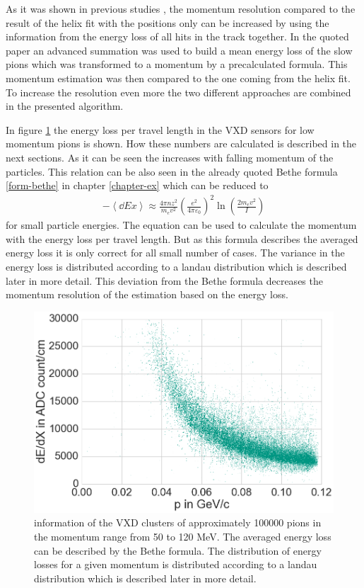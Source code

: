 As it was shown in previous studies \cite{robert}, the momentum resolution compared to the result of the helix fit with the positions only can be increased by using the information from the energy loss of all hits in the track together. In the quoted paper an advanced summation was used to build a mean energy loss of the slow pions which was transformed to a momentum by a precalculated formula. This momentum estimation was then compared to the one coming from the helix fit. To increase the resolution even more the two different approaches are combined in the presented algorithm.

In figure \ref{fig-dedx-over-p} the energy loss per travel length in the VXD sensors for low momentum pions is shown. How these numbers are calculated is described in the next sections. As it can be seen the \dedx increases with falling momentum of the particles. This relation can be also seen in the already quoted Bethe formula \ref{form-bethe} in chapter \ref{chapter-ex} which can be reduced to 
\begin{align*}
 -\left \langle \dd{E}{x} \right\rangle \approx \frac{4 \pi n z^2}{m_e v^2} \left( \frac{e^2}{4 \pi \varepsilon_0} \right)^2 \ln \left( \frac{2 m_e v^2}{I} \right)
\end{align*} 
for small particle energies. The equation can be used to calculate the momentum with the energy loss per travel length. But as this formula describes the averaged energy loss it is only correct for all small number of cases. The variance in the energy loss is distributed according to a landau distribution which is described later in more detail. This deviation from the Bethe formula decreases the momentum resolution of the estimation based on the energy loss.

\begin{figure}
 \centering
 \includegraphics[width=0.8\linewidth]{figures/vxd/dedx.png}
 \caption{\dedx information of the VXD clusters of approximately 100000 pions in the momentum range from 50 to 120 MeV. The averaged energy loss can be described by the Bethe formula. The distribution of energy losses for a given momentum is distributed according to a landau distribution which is described later in more detail.}
 \label{fig-dedx-over-p}
\end{figure}


